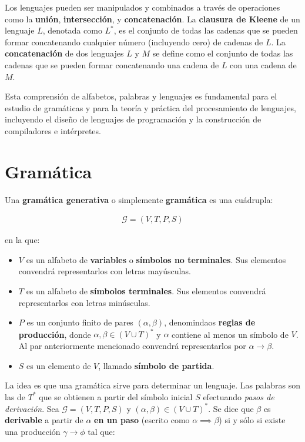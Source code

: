 Los lenguajes pueden ser manipulados y combinados a través de operaciones como la \textbf{unión}, \textbf{intersección}, y \textbf{concatenación}. La \textbf{clausura de Kleene} de un lenguaje $L$, denotada como $L^*$, es el conjunto de todas las cadenas que se pueden formar concatenando cualquier número (incluyendo cero) de cadenas de $L$. La \textbf{concatenación} de dos lenguajes $L$ y $M$ se define como el conjunto de todas las cadenas que se pueden formar concatenando una cadena de $L$ con una cadena de $M$.

Esta comprensión de alfabetos, palabras y lenguajes es fundamental para el estudio de gramáticas y para la teoría y práctica del procesamiento de lenguajes, incluyendo el diseño de lenguajes de programación y la construcción de compiladores e intérpretes.

\section{Gramática}\label{section:gramatica}
\noindent
Una \textbf{gramática generativa} o simplemente \textbf{gramática} es una cuádrupla:

\begin{align*}
    \mathcal{G} = (V,T,P,S)
\end{align*}

\noindent
en la que:

\begin{itemize}
    \item $V$ es un alfabeto de \textbf{variables} o \textbf{símbolos no terminales}. Sus elementos convendrá representarlos con letras mayúsculas.
    \item $T$ es un alfabeto de \textbf{símbolos terminales}. Sus elementos convendrá representarlos con letras minúsculas.
    \item $P$ es un conjunto finito de pares $(\alpha,\beta)$, denomindaos \textbf{reglas de producción}, donde $\alpha,\beta \in (V \cup T)^*$ y $\alpha$ contiene al menos un símbolo de $V$. Al par anteriormente mencionado convendrá representarlos por $\alpha \rightarrow \beta$.
    \item $S$ es un elemento de $V$, llamado \textbf{símbolo de partida}.
\end{itemize}

La idea es que una gramática sirve para determinar un lenguaje. Las palabras son las de $T^*$ que se obtienen a partir del símbolo inicial $S$ efectuando \textit{pasos de derivación}. Sea $\mathcal{G} = (V,T,P,S)$ y $(\alpha,\beta)\in (V \cup T)^*$. Se dice que $\beta$ es \textbf{derivable} a partir de $\alpha$ \textbf{en un paso} (escrito como $\alpha \implies \beta$) si y sólo si existe una producción $\gamma \rightarrow \phi$ tal que:

